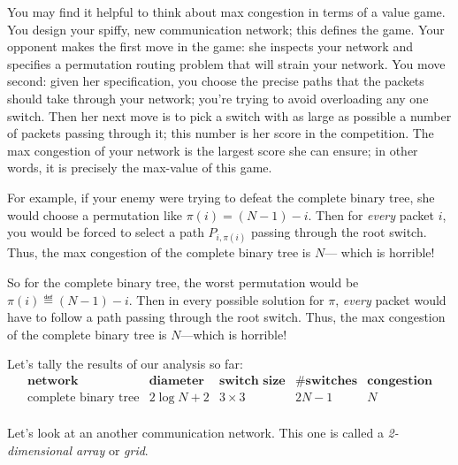 \begin{editingnotes}

You may find it helpful to think about max congestion in terms of a value
game.  You design your spiffy, new communication network; this defines the
game.  Your opponent makes the first move in the game: she inspects your
network and specifies a permutation routing problem that will strain your
network.\iffalse
That is, her first move is a specification of which input terminals must
send a packet to which output terminals.
\fi
You move second: given her specification, you choose the precise paths
that the packets should take through your network; you're trying to avoid
overloading any one switch.  Then her next move is to pick a switch with
as large as possible a number of packets passing through it; this number
is her score in the competition.  The max congestion of your network is
the largest score she can ensure; in other words, it is precisely the
max-value of this game.

For example, if your enemy were trying to defeat the complete binary
tree, she would choose a permutation like $\pi(i) = (N - 1) - i$.
Then for \textit{every} packet $i$, you would be forced to select a
path $P_{i, \pi(i)}$ passing through the root switch.  Thus, the max
congestion of the complete binary tree is $N$--- which is horrible!

\end{editingnotes}

So for the complete binary tree, the worst permutation would be
$\pi(i) \eqdef (N - 1) - i$.  Then in every possible solution for
$\pi$, \textit{every} packet would have to follow a path passing
through the root switch.  Thus, the max congestion of the complete
binary tree is $N$---which is horrible!

Let's tally the results of our analysis so far:
%
\[
\begin{array}{r|c|c|c|c}
\textbf{network} &
\textbf{diameter} &
\textbf{switch size} &
\textbf{\# switches} &
\textbf{congestion} \\ \hline
\text{complete binary tree} & 2 \log N + 2 & 3 \times 3 & 2N - 1 & N \\
\end{array}
\]

\label{2Darray}

Let's look at an another communication network.  This one is called a
\emph{2-dimensional array}%
or \emph{grid}.

